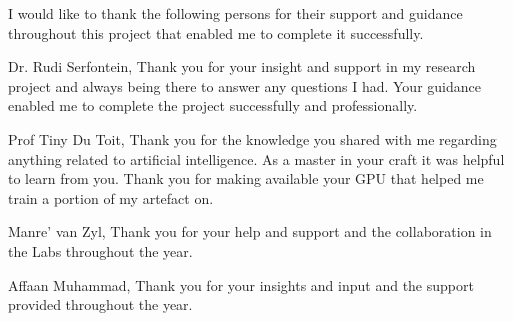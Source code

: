 \documentclass[a4paper,oneside,12pt]{book}
\begin{document}

\MakeTitle %


\begin{Acknowledgements}{}
			I would like to thank the following persons for their support and guidance throughout this project that enabled me to complete it successfully.
			
			Dr. Rudi Serfontein, Thank you for your insight and support in my research project and always being there to answer any questions I had. Your guidance enabled me to complete the project successfully and professionally. 
			
			Prof   Tiny Du Toit, Thank you for the knowledge you shared with me regarding anything related to artificial intelligence. As a master in your craft it was helpful to learn from you. Thank you for making available your GPU that helped me train a portion of my artefact on.
			
			Manre' van Zyl, Thank you for your help and support and the collaboration in the Labs throughout the year.
			
			Affaan Muhammad, Thank you for your insights and input and the support provided throughout the year.
\end{Acknowledgements}
\end{document}
